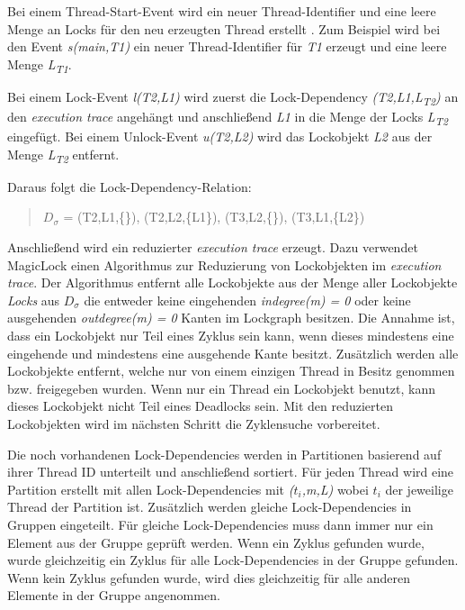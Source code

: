 Bei einem Thread-Start-Event wird ein neuer Thread-Identifier und eine leere
Menge an Locks für den neu erzeugten Thread erstellt
\autocite[vgl.][4]{MagicLock}. Zum Beispiel wird bei den Event \emph{s(main,T1)}
ein neuer Thread-Identifier für \emph{T1} erzeugt und eine leere Menge
\emph{L\textsubscript{T1}}.

Bei einem Lock-Event \emph{l(T2,L1)} wird zuerst die Lock-Dependency
\emph{(T2,L1,L\textsubscript{T2})} an den \emph{execution trace} angehängt und
anschließend \emph{L1} in die Menge der Locks
\emph{L\textsubscript{T2}} eingefügt. Bei einem Unlock-Event \emph{u(T2,L2)}
wird das Lockobjekt \emph{L2} aus der Menge \emph{L\textsubscript{T2}}
entfernt.\autocite[vgl.][4]{MagicLock}

Daraus folgt die Lock-Dependency-Relation:
\begin{quote}
  \textbf{$D_\sigma$} = (T2,L1,\{\}), (T2,L2,\{L1\}), (T3,L2,\{\}),
  (T3,L1,\{L2\})
\end{quote}
Anschließend wird ein reduzierter \emph{execution trace} erzeugt. Dazu verwendet
MagicLock einen Algorithmus zur Reduzierung von Lockobjekten im \emph{execution
trace}. Der Algorithmus entfernt alle Lockobjekte aus der Menge aller
Lockobjekte \emph{Locks} aus \emph{$D_\sigma$} die entweder keine eingehenden
\emph{indegree(m) = 0} oder keine ausgehenden \emph{outdegree(m) = 0} Kanten im
Lockgraph besitzen. Die Annahme ist, dass ein Lockobjekt nur Teil eines Zyklus
sein kann, wenn dieses mindestens eine eingehende und mindestens eine ausgehende
Kante besitzt. Zusätzlich werden alle Lockobjekte entfernt, welche nur von einem
einzigen Thread in Besitz genommen bzw. freigegeben wurden. Wenn nur ein Thread
ein Lockobjekt benutzt, kann dieses Lockobjekt nicht Teil eines Deadlocks sein.
Mit den reduzierten Lockobjekten wird im nächsten Schritt die Zyklensuche
vorbereitet.\autocite[vgl.][4]{MagicLock}

Die noch vorhandenen Lock-Dependencies werden in Partitionen basierend auf ihrer
Thread ID unterteilt und anschließend sortiert. Für jeden Thread wird eine
Partition erstellt mit allen Lock-Dependencies mit \emph{($t_i$,m,L)} wobei
\emph{$t_i$} der jeweilige Thread der Partition ist. Zusätzlich werden gleiche
Lock-Dependencies in Gruppen eingeteilt. Für gleiche Lock-Dependencies muss dann
immer nur ein Element aus der Gruppe geprüft werden. Wenn ein Zyklus gefunden
wurde, wurde gleichzeitig ein Zyklus für alle Lock-Dependencies in der Gruppe
gefunden. Wenn kein Zyklus gefunden wurde, wird dies gleichzeitig für alle
anderen Elemente in der Gruppe angenommen.\autocite[vgl.][8-9]{MagicLock}

